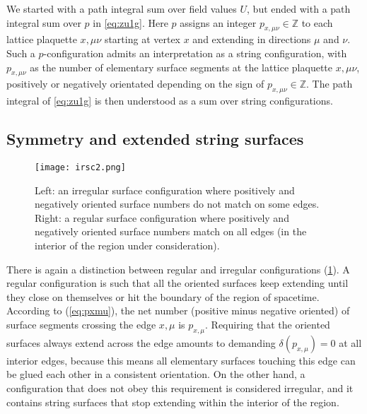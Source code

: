 \documentclass[12pt]{article}
\theoremstyle{definition}
\begin{document}

We started with a path integral sum over field values $U$, but ended with a path integral sum over $p$ in \eqref{eq:zu1g}. Here $p$ assigns an integer $p_{x,\mu\nu}\in\mathbb{Z}$ to each lattice plaquette $x,\mu\nu$ starting at vertex $x$ and extending in directions $\mu$ and $\nu$. Such a $p$-configuration admits an interpretation as a string configuration, with $p_{x,\mu\nu}$ as the number of elementary surface segments at the lattice plaquette $x,\mu\nu$, positively or negatively orientated depending on the sign of $p_{x,\mu\nu}\in\mathbb{Z}$. The path integral of \eqref{eq:zu1g} is then understood as a sum over string configurations.

\subsection*{Symmetry and extended string surfaces}\label{sec:sess}

\begin{figure}%
    \centering
    \texttt{[image: irsc2.png]}
    \caption{Left: an irregular surface configuration where positively and negatively oriented surface numbers do not match on some edges. Right: a regular surface configuration where positively and negatively oriented surface numbers match on all edges (in the interior of the region under consideration).}
    \label{fig:irsc2}
\end{figure} 

There is again a distinction between regular and irregular configurations (\cref{fig:irsc2}). A regular configuration is such that all the oriented surfaces keep extending until they close on themselves or hit the boundary of the region of spacetime. According to (\ref{eq:pxmu}), the net number (positive minus negative oriented) of surface segments crossing the edge $x,\mu$ is $p_{x,\mu}$. Requiring that the oriented surfaces always extend across the edge amounts to demanding $\delta(p_{x,\mu})=0$ at all interior edges, because this means all elementary surfaces touching this edge can be glued each other in a consistent orientation. On the other hand, a configuration that does not obey this requirement is considered irregular, and it contains string surfaces that stop extending within the interior of the region. 
\end{document}

